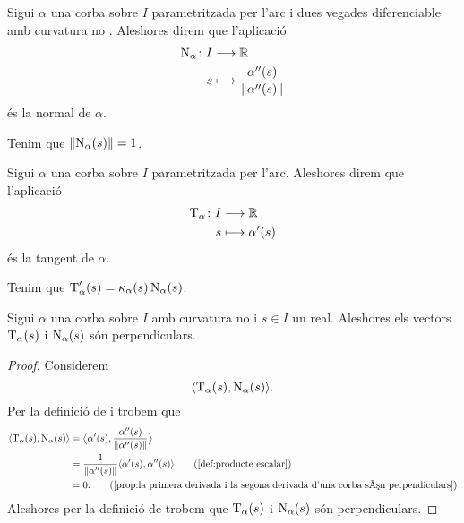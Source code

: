 \documentclass[../../Main.tex]{subfiles}
\begin{document}
	\begin{definition}[Normal]
		\label{def:normal}
		Sigui \(\alpha\) una corba sobre \(I\) parametritzada per l'arc i dues vegades diferenciable amb curvatura no \nulla{}. Aleshores direm que l'aplicació
		\begin{align*}
			\normal_{\alpha}\colon I&\longrightarrow\mathbb{R} \\
			s&\longmapsto\frac{\alpha''(s)}{\norm{\alpha''(s)}}
		\end{align*}
		és la normal de \(\alpha\).
	\end{definition}
	\begin{observation}
		\label{obs:la normal a una corba és unitària}
		Tenim que \(\norm{\normal_{\alpha}(s)}=1\).
	\end{observation}
	\begin{definition}[Tangent]
		\label{def:tangent}
		Sigui \(\alpha\) una corba sobre \(I\) parametritzada per l'arc. Aleshores direm que l'aplicació
		\begin{align*}
			\operatorname{T}_{\alpha}\colon I&\longrightarrow\mathbb{R} \\
			s&\longmapsto\alpha'(s)
		\end{align*}
		és la tangent de \(\alpha\).
	\end{definition}
	\begin{observation}
		\label{obs:la derivada de la tangent és la curvatura per la normal}
		Tenim que \(\operatorname{T}_{\alpha}'(s)=\operatorname{\kappa}_{\alpha}(s)\operatorname{N}_{\alpha}(s)\).
	\end{observation}
	\begin{proposition}
		\label{prop:la tangent i la normal d'una corba amb curvatura no nula són perpendiculars}
		Sigui \(\alpha\) una corba sobre \(I\) amb curvatura no \nulla{} i \(s\in I\) un real. Aleshores els vectors \(\operatorname{T}_{\alpha}(s)\) i \(\operatorname{N}_{\alpha}(s)\) són perpendiculars.
		\begin{proof}
			Considerem
			\[\prodesc{\tangent_{\alpha}(s)}{\normal_{\alpha}(s)}.\]
			Per la definició de  i  trobem que
			\begin{align*}
				\prodesc{\tangent_{\alpha}(s)}{\normal_{\alpha}(s)}&=\prodesc[\big]{\alpha'(s)}{\frac{\alpha''(s)}{\norm{\alpha''(s)}}} \\
				&=\frac{1}{\norm{\alpha''(s)}}\prodesc{\alpha'(s)}{\alpha''(s)} \tag{\ref{def:producte escalar}} \\
				&=0. \tag{\ref{prop:la primera derivada i la segona derivada d'una corba són perpendiculars}}
			\end{align*}
			Aleshores per la definició de  trobem que \(\operatorname{T}_{\alpha}(s)\) i \(\operatorname{N}_{\alpha}(s)\) són perpendiculars.
		\end{proof}
	\end{proposition}
\end{document}
